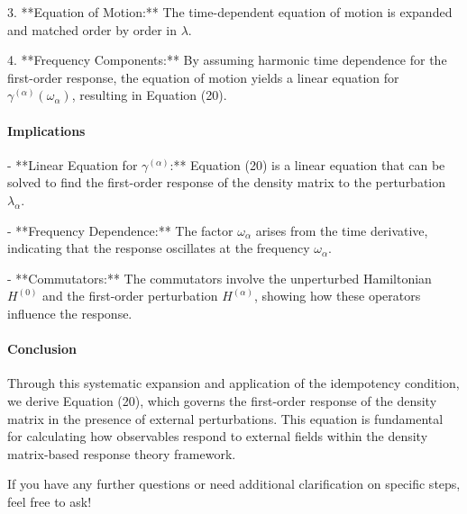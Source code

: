 \documentclass[12pt]{article}
\begin{document}
3. **Equation of Motion:** The time-dependent equation of motion is expanded and matched order by order in \( \lambda \).

4. **Frequency Components:** By assuming harmonic time dependence for the first-order response, the equation of motion yields a linear equation for \( \gamma^{(\alpha)}(\omega_{\alpha}) \), resulting in Equation (20).

\paragraph{Implications}

- **Linear Equation for \( \gamma^{(\alpha)} \):** Equation (20) is a linear equation that can be solved to find the first-order response of the density matrix to the perturbation \( \lambda_{\alpha} \).

- **Frequency Dependence:** The factor \( \omega_{\alpha} \) arises from the time derivative, indicating that the response oscillates at the frequency \( \omega_{\alpha} \).

- **Commutators:** The commutators involve the unperturbed Hamiltonian \( H^{(0)} \) and the first-order perturbation \( H^{(\alpha)} \), showing how these operators influence the response.

\paragraph{Conclusion}

Through this systematic expansion and application of the idempotency condition, we derive Equation (20), which governs the first-order response of the density matrix in the presence of external perturbations. This equation is fundamental for calculating how observables respond to external fields within the density matrix-based response theory framework.

If you have any further questions or need additional clarification on specific steps, feel free to ask!
\end{document}
